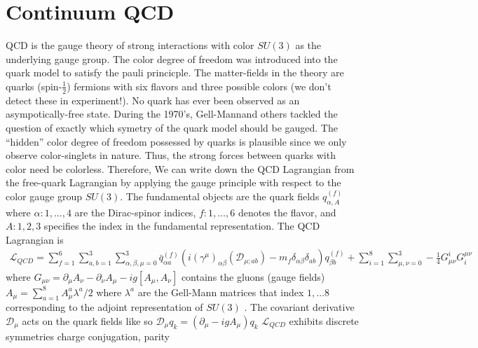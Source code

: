 \section{Continuum QCD}
QCD is the gauge theory of strong interactions with color $SU(3)$ as the underlying gauge group. The color degree of freedom was introduced into the quark model to satisfy the pauli princicple. The matter-fields in the theory are quarks (spin-$\frac{1}{2}$) fermions with six flavors and three possible colors (we don't detect these in experiment!). No quark has ever been observed as an asympotically-free state. During the 1970's, Gell-Mann\cite{Gell-Mann:1964ewy}and others \cite{PhysRevD.8.3633}\cite{PhysRevLett.31.494} tackled the question of exactly which symetry of the quark model should be gauged. The ``hidden'' color degree of freedom possessed by quarks is plausible since we only observe color-singlets in nature. Thus, the strong forces between quarks with color need be colorless. Therefore, We can write down the QCD Lagrangian from the free-quark Lagrangian by applying the gauge principle with respect to the color gauge group $SU(3)$. The fundamental objects are the quark fields  $q_{\alpha,A}^{(f)}$ where $\alpha: 1,\dots,4$ are the Dirac-spinor indices, $f: 1,\dots,6$ denotes the flavor, and  $A: 1,2,3$ specifies the  index in the fundamental representation. 
The QCD Lagrangian is 
\begin{align}
    \mathcal{L}_{QCD} = \sum_{f=1}^{6} \sum_{a,b=1}^{3} \sum_{\alpha,\beta,\mu=0}^{3} \bar{q}_{\alpha a}^{(f)}(i(\gamma^\mu)_{\alpha \beta}(\mathcal{D}_{\mu;ab}) - m_f\delta_{\alpha \beta}\delta_{ab}) q_{\beta b}^{(f)} + \sum_{i=1}^{8}\sum_{\mu,\nu=0}^{3} -\frac{1}{4} G_{\mu\nu}^i G_i^{\mu\nu}
\end{align}
where $G_{\mu\nu} = \partial_\mu A_\nu - \partial_\nu A_\mu - ig[A_\mu,A_\nu]$ contains the gluons (gauge fields) $A_\mu = \sum_{a=1}^{8}A_\mu^a \lambda^a/2$ where $\lambda^a$ are the Gell-Mann matrices that index $1,\dots 8$ corresponding to the adjoint representation of $SU(3)$ . The covariant derivative $\mathcal D_\mu$ acts on the quark fields like so $\mathcal D_\mu q_k = (\partial_\mu - igA_\mu)q_k$ 
$\mathcal{L}_{QCD}$ exhibits discrete symmetries charge conjugation, parity 

